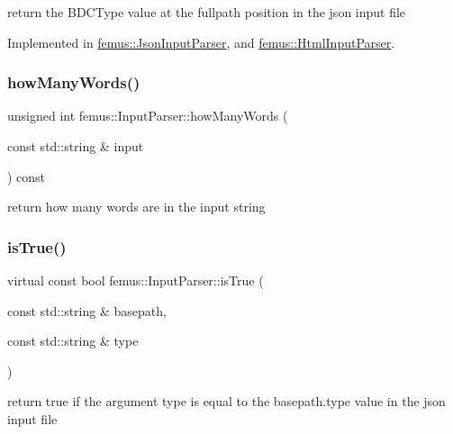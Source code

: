 return the B\+D\+C\+Type value at the {\ttfamily fullpath} position in the json input file 

Implemented in \mbox{\hyperlink{classfemus_1_1_json_input_parser_a02383042c4eaebfd7e0743abcb91d771}{femus\+::\+Json\+Input\+Parser}}, and \mbox{\hyperlink{classfemus_1_1_html_input_parser_a243d191b91055db6ab63123774360377}{femus\+::\+Html\+Input\+Parser}}.

\mbox{\label{classfemus_1_1_input_parser_a9e790b63c7b8f1bbcb07097d144fbd9e}} 
\subsubsection{\texorpdfstring{how\+Many\+Words()}{howManyWords()}}
{\footnotesize\ttfamily unsigned int femus\+::\+Input\+Parser\+::how\+Many\+Words (\begin{DoxyParamCaption}\item[{const std\+::string \&}]{input }\end{DoxyParamCaption}) const\hspace{0.3cm}{\ttfamily [protected]}}

return how many words are in the input string \mbox{\label{classfemus_1_1_input_parser_aa9a108efd3c78de43435a43c229a21e5}} 
\subsubsection{\texorpdfstring{is\+True()}{isTrue()}}
{\footnotesize\ttfamily virtual const bool femus\+::\+Input\+Parser\+::is\+True (\begin{DoxyParamCaption}\item[{const std\+::string \&}]{basepath,  }\item[{const std\+::string \&}]{type }\end{DoxyParamCaption})\hspace{0.3cm}{\ttfamily [pure virtual]}}

return true if the argument type is equal to the basepath.\+type value in the json input file 

